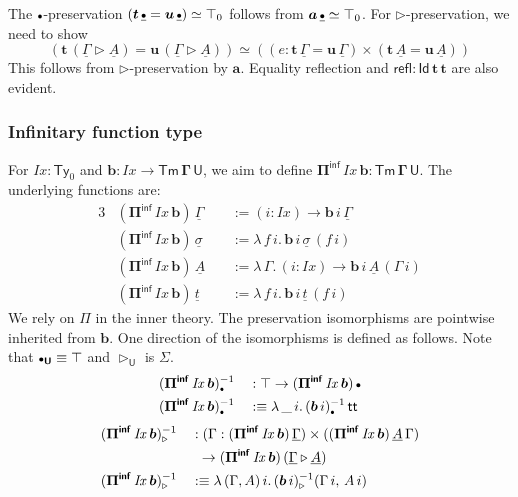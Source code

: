 \documentclass[12pt,a4paper,twoside,openany]{book}
\theoremstyle{remark}
\theoremstyle{definition}
\theoremstyle{theorem}
\newcommand{\mi}[1]{\mathit{#1}}
\newcommand{\bs}[1]{\boldsymbol{#1}}
\newcommand{\refl}{\mathsf{refl}}
\newcommand{\Tm}{\mathsf{Tm}}
\newcommand{\Ty}{\mathsf{Ty}}
\newcommand{\U}{\mathsf{U}}
\newcommand{\Id}{\mathsf{Id}}
\renewcommand{\tt}{\mathsf{tt}}
\newcommand{\ra}{\rightarrow}
\newcommand{\ext}{\triangleright}
\newcommand{\emptycon}{\scaleobj{.75}\bullet}
\newcommand{\Piinf}{\Pi^{\mathsf{inf}}}
\newcommand{\bTm}{\bs{\Tm}}
\newcommand{\bGamma}{\bs{\Gamma}}
\newcommand{\bt}{\bs{t}}
\newcommand{\bu}{\bs{u}}
\newcommand{\ba}{\bs{a}}
\newcommand{\bb}{\bs{b}}
\newcommand{\bU}{\bs{\U}}
\newcommand{\bPiinf}{\bs{\Piinf}}
\newcommand{\bId}{\bs{\Id}}
\newcommand{\ul}[1]{\underline{#1}}
\newcommand{\ulGamma}{\ul{\Gamma}}
\newcommand{\ulsigma}{\ul{\sigma}}
\newcommand{\ulemptycon}{\ul{\emptycon}}
\newcommand{\ult}{\ul{t}}
\newcommand{\ulA}{\ul{A}}
\newcommand{\defn}{:\equiv}
\begin{document}
The $\emptycon$-preservation $(\bt\,\ulemptycon = \bu\,\ulemptycon) \simeq
\top_0$ follows from $\ba\,\ulemptycon \simeq \top_0$. For $\ext$-preservation,
we need to show
\[
 (\bt\,(\ulGamma \ext \ulA) = \bu\,(\ulGamma \ext \ulA)) \simeq
 ((e : \bt\,\ulGamma = \bu\,\ulGamma) \times (\bt\,\ulA = \bu\,\ulA))
\]
This follows from $\ext$-preservation by $\ba$. Equality reflection and
$\bs{\refl :} \bId\,\bt\,\bt$ are also evident.

\subsubsection{Infinitary function type}

For $\mi{Ix} : \Ty_0$ and $\bb : \mi{Ix} \ra \bTm\,\bGamma\,\bU$, we aim to define
$\bPiinf\,\mi{Ix}\,\bb \bs{:} \bTm\,\bGamma\,\bU$. The underlying functions
are:
\begin{alignat*}{3}
  & (\bPiinf\,\mi{Ix}\,\bb)\,\ulGamma    &&:= (i : \mi{Ix})\ra \bb\,i\,\ulGamma\\
  & (\bPiinf\,\mi{Ix}\,\bb)\,\ulsigma    &&:= \lambda\,f\,i.\, \bb\,i\,\ulsigma\,(f\,i)\\
  & (\bPiinf\,\mi{Ix}\,\bb)\,\ulA\       &&:= \lambda\,\Gamma.\,(i : \mi{Ix})\ra \bb\,i\,\ulA\,(\Gamma\, i)\\
  & (\bPiinf\,\mi{Ix}\,\bb)\,\ult        &&:= \lambda\,f\,i.\, \bb\,i\,\ult\,(f\,i)
\end{alignat*}
We rely on $\Pi$ in the inner theory. The preservation isomorphisms are
pointwise inherited from $\bb$. One direction of the isomorphisms is defined as
follows. Note that $\emptycon_{\bU} \equiv \top$ and $\ext_{\bU}$ is $\Sigma$.
\begin{alignat*}{3}
  &(\bPiinf\,\mi{Ix}\,\bb)_{\emptycon}^{-1} && : \top\ra (\bPiinf\,\mi{Ix}\,\bb)\,\emptycon\\
  &(\bPiinf\,\mi{Ix}\,\bb)_{\emptycon}^{-1} && \defn \lambda\,\_\,i.\,(\bb\,i)_{\emptycon}^{-1}\,\tt
\end{alignat*}
\begin{alignat*}{3}
  &(\bPiinf\,\mi{Ix}\,\bb)_{\ext}^{-1} && : (\Gamma : (\bPiinf\,\mi{Ix}\,\bb)\,\ulGamma)\times((\bPiinf\,\mi{Ix}\,\bb)\,\ulA\,\Gamma)\\
  & && \hspace{0.5em}\ra (\bPiinf\,\mi{Ix}\,\bb)\,(\ulGamma \ext \ulA)\\
  & (\bPiinf\,\mi{Ix}\,\bb)_{\ext}^{-1} && \defn \lambda\,(\Gamma,A)\,i.\,(\bb\,i)_{\ext}^{-1}(\Gamma\,i,\,A\,i)
\end{alignat*}
\end{document}
